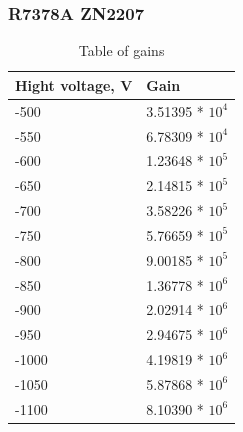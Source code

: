 \documentclass{beamer}
\begin{document}
\begin{frame}
\frametitle{R7378A ZN2207}
\begin{table}
\begin{tabular}{l l}
\toprule
\textbf{Hight voltage, V} & \textbf{Gain} \\
\midrule
-500  &  3.51395 * $10^4$\\
-550  &  6.78309 * $10^4$\\
-600  &  1.23648 * $10^5$\\
-650  &  2.14815 * $10^5$\\
-700  &  3.58226 * $10^5$\\
-750  &  5.76659 * $10^5$\\
-800  &  9.00185 * $10^5$\\
-850  &  1.36778 * $10^6$\\
-900  &  2.02914 * $10^6$\\
-950  &  2.94675 * $10^6$\\
-1000 &  4.19819 * $10^6$\\
-1050 &  5.87868 * $10^6$\\
-1100 &  8.10390 * $10^6$\\
\bottomrule
\end{tabular}
\caption{Table of gains}
\end{table}
\end{frame}
\end{document}
